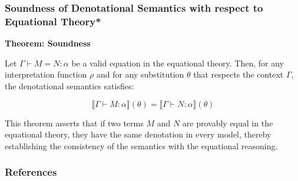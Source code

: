\documentclass[aspectratio=169]{beamer}
\begin{document}
\begin{frame}
\frametitle{Soundness of Denotational Semantics with respect to Equational Theory*}

\textbf{Theorem: Soundness}

Let $\Gamma \vdash M = N : \alpha$ be a valid equation in the equational theory. Then, for any interpretation function $\rho$ and for any substitution $\theta$ that respects the context $\Gamma$, the denotational semantics satisfies:

\[
\llbracket \Gamma \vdash M : \alpha \rrbracket (\theta) = \llbracket \Gamma \vdash N : \alpha \rrbracket (\theta)
\]

\medskip

This theorem asserts that if two terms $M$ and $N$ are provably equal in the equational theory, they have the same denotation in every model, thereby establishing the consistency of the semantics with the equational reasoning.
\end{frame}


\begin{frame}
\frametitle{References}

\printbibliography
\end{frame}
\end{document}
